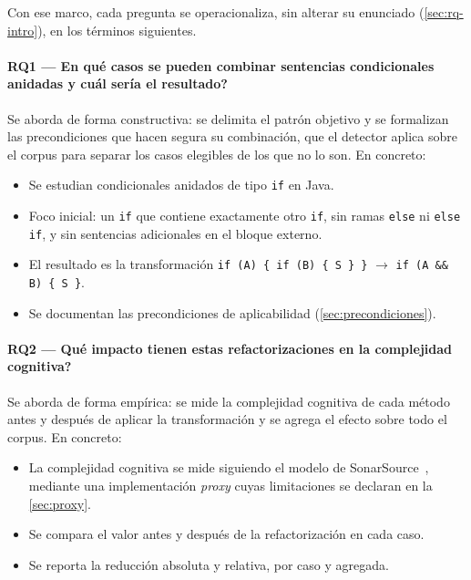 Con ese marco, cada pregunta se operacionaliza, sin alterar su enunciado
(\autoref{sec:rq-intro}), en los términos siguientes.

\paragraph{RQ1 — \textquestiondown{}En qué casos se pueden combinar sentencias condicionales anidadas y cuál sería el resultado?}
Se aborda de forma constructiva: se delimita el patrón objetivo y se formalizan
las precondiciones que hacen segura su combinación, que el detector aplica sobre
el corpus para separar los casos elegibles de los que no lo son. En concreto:
\begin{itemize}
  \item Se estudian condicionales anidados de tipo \lstinline|if| en Java.
  \item Foco inicial: un \lstinline|if| que contiene exactamente otro
  \lstinline|if|, sin ramas \lstinline|else| ni \lstinline|else if|, y sin
  sentencias adicionales en el bloque externo.
  \item El resultado es la transformación
  \lstinline|if (A) { if (B) { S } }| $\rightarrow$ \lstinline|if (A && B) { S }|.
  \item Se documentan las precondiciones de aplicabilidad
  (\autoref{sec:precondiciones}).
\end{itemize}

\paragraph{RQ2 — \textquestiondown{}Qué impacto tienen estas refactorizaciones en la complejidad cognitiva?}
Se aborda de forma empírica: se mide la complejidad cognitiva de cada método
antes y después de aplicar la transformación y se agrega el efecto sobre todo el
corpus. En concreto:
\begin{itemize}
  \item La complejidad cognitiva se mide siguiendo el modelo de
  SonarSource~\cite{10.1145/3194164.3194186}, mediante una implementación
  \emph{proxy} cuyas limitaciones se declaran en la \autoref{sec:proxy}.
  \item Se compara el valor antes y después de la refactorización en cada caso.
  \item Se reporta la reducción absoluta y relativa, por caso y agregada.
\end{itemize}

